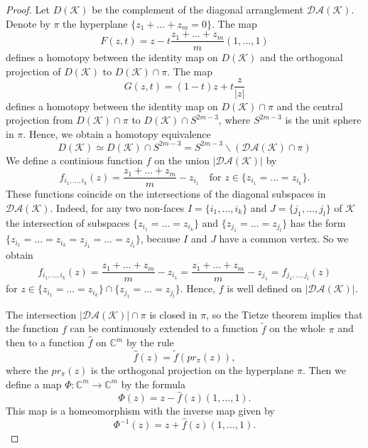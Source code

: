 \documentclass[a4paper,12pt]{amsart}
\newcommand{\K}{\mathcal K}
\newcommand{\CC}{\mathbb C}
\theoremstyle{definition}
\theoremstyle{remark}
\numberwithin{equation}{section}
\begin{document}
\begin{proof}
Let $D(\K)$ be the complement of the diagonal arranglement $\mathcal{DA}(\K)$.
	Denote by $\pi$ the hyperplane $\{z_1 + \dots + z_m = 0 \}$. The map
	$$F(z, t) = z - t \frac{z_1 + \dots + z_m}{m} (1, \dots, 1)$$
	defines a homotopy between the identity map on $D(\K)$ and the orthogonal projection of $D(\K)$ to $D(\K) \cap \pi$.
	The map
	$$G(z, t) = (1-t) z + t \frac{z}{|z|}$$
	defines a homotopy between the identity map on $D(\K) \cap \pi$ and
	the central projection from $D(\K) \cap \pi$ to $D(\K) \cap S^{2m-3}$, where $S^{2m-3}$ is the unit sphere in $\pi$.
Hence, we obtain a homotopy equivalence %
\begin{equation}\label{dk-to-s-pi}
D(\K) \simeq D(\K) \cap S^{2m-3} = S^{2m-3} \backslash (\mathcal{DA}(\K) \cap \pi)
\end{equation}
We define a continious function $f$ on the union $|\mathcal{DA}(\K)|$ by
\[ 
  f_{i_1, \dots, i_k}(z) = \frac{z_1 + \dots + z_m }{m} - z_{i_1}\quad\text{for }z\in\{z_{i_1} = \dots = z_{i_k} \}.
\]
These functions coincide on the intersections of the diagonal  subspaces in $\mathcal{DA}(\K)$. Indeed,
	for any two non-faces $I = \{i_1, \dots, i_k\}$ and $J = \{j_1, \dots, j_l \}$ of $\K$
	the intersection of subspaces $\{z_{i_1} = \dots = z_{i_k} \}$ 
	and $\{z_{j_1} = \dots = z_{j_l} \}$ has the form $\{z_{i_1} = \dots = z_{i_k} = z_{j_1} = \dots = z_{j_l} \}$,
	because $I$ and $J$ have a common vertex. So we obtain
	$$f_{i_1, \dots, i_k}(z) = \frac{z_1 + \dots + z_m }{m} - z_{i_1} = \frac{z_1 + \dots + z_m }{m} - z_{j_1} = f_{j_1, \dots, j_l}(z)$$
	for $z \in \{z_{i_1} = \dots = z_{i_k}\} \cap \{z_{j_1} = \dots = z_{j_l}\}$. 
Hence, $f$ is well defined on $|\mathcal{DA}(\K)|$.
	
The intersection $|\mathcal{DA}(\K)| \cap \pi$ is closed in $\pi$, so the Tietze theorem implies that the function $f$ can be continuously extended to a function $\widetilde{f}$ on the whole $\pi$ and then to a function $\widehat{f}$ on $\CC^m$
by the rule
	$$\widehat{f}(z) = \widetilde{f}(pr_{\pi}(z)),$$
where the $pr_{\pi}(z)$ is the orthogonal projection on the hyperplane $\pi$.
Then we define a map $\Phi \colon \CC^m \to \CC^m$ by the formula	$$\Phi (z) = z - \widehat{f}(z) (1, \dots, 1).$$
This map is a homeomorphism with the inverse map given by
	$$\Phi^{-1}(z) = z + \widehat{f}(z) (1, \dots, 1).$$
	

\end{proof}
\end{document}
